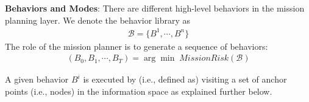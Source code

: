 \documentclass[letterpaper, 10pt, conference]{ieeeconf}      %
\newcommand{\ph}[1]{{\textbf{#1}:}} %
\newcommand{\todo}[1]{{\color{red} #1 }} %
\begin{document}
\ph{Behaviors and Modes}
There are different high-level behaviors in the mission planning layer. 
We denote the behavior library as
\begin{align}
    \mathcal{B} = \{B^1,\cdots,B^n \}
\end{align}
The role of the mission planner is to generate a sequence of behaviors:
\begin{align}
    (B_0,B_1,\cdots,B_T) = \arg\min \; \textit{MissionRisk} (\mathcal{B}) 
\end{align}

A given behavior $B^i$ is executed by (i.e., defined as) visiting a set of anchor points (i.e., nodes) in the information space as explained further below. 





\end{document}
